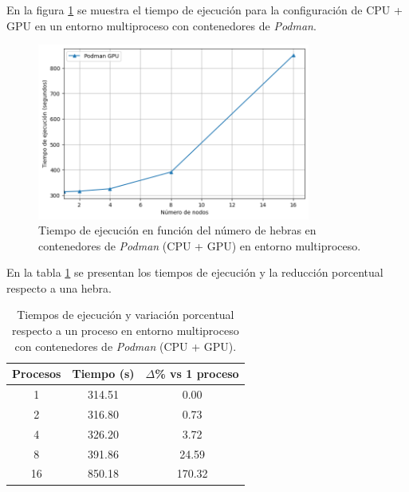 En la figura \ref{fig:multi-node_ubuntu_podman_gpu_time} se muestra el tiempo de ejecución para la configuración de CPU + GPU en un entorno multiproceso con contenedores de \textit{Podman}.

\begin{figure}[ht]
    \centering
    \includegraphics[width=0.8\textwidth]{imagenes/cap5/multi-node_ubuntu_podman_gpu_time.png}
    \caption{Tiempo de ejecución en función del número de hebras en contenedores de \textit{Podman} (CPU + GPU) en entorno multiproceso.}
    \label{fig:multi-node_ubuntu_podman_gpu_time}
\end{figure}

En la tabla \ref{tab:multi-node_ubuntu_podman_gpu} se presentan los tiempos de ejecución y la reducción porcentual respecto a una hebra.

\begin{table}[ht]
    \centering
    \begin{tabular}{|c|c|c|}
        \hline
        \textbf{Procesos} & \textbf{Tiempo (s)} & \textbf{$\Delta$\% vs 1 proceso} \\
        \hline
        1                 & 314.51              & 0.00                             \\
        2                 & 316.80              & 0.73                             \\
        4                 & 326.20              & 3.72                             \\
        8                 & 391.86              & 24.59                            \\
        16                & 850.18              & 170.32                           \\
        \hline
    \end{tabular}
    \caption{Tiempos de ejecución y variación porcentual respecto a un proceso en entorno multiproceso con contenedores de \textit{Podman} (CPU + GPU).}
    \label{tab:multi-node_ubuntu_podman_gpu}
\end{table}

